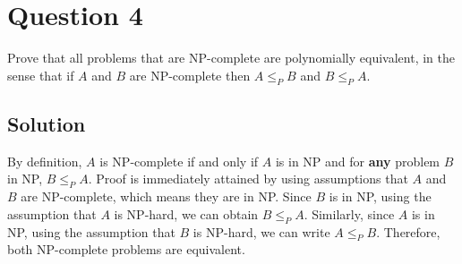 
\section*{Question 4}

Prove that all problems that are NP-complete are polynomially equivalent, in the sense that if $A$ and $B$ are NP-complete then $A \leq_P B$ and $B \leq_P A$.

\subsection*{Solution}
By definition, $A$ is NP-complete if and only if $A$ is in NP and for \textbf{any} problem $B$ in NP, $B\leq_P A$. Proof is immediately attained by using assumptions that $A$ and $B$ are NP-complete, which means they are in NP. Since $B$ is in NP, using the assumption that $A$ is NP-hard, we can obtain $B \leq_P A$.
Similarly, since $A$ is in NP, using the assumption that $B$ is NP-hard, we can write $A \leq_P B$. Therefore, both NP-complete problems are equivalent.
